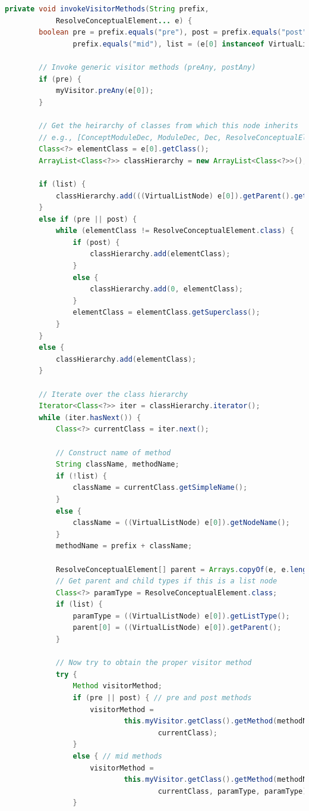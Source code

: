 \documentclass[times]{speauth}
\begin{document}
\begin{lstlisting}[language=java,caption={TreeWalker.java}]
    private void invokeVisitorMethods(String prefix,
            ResolveConceptualElement... e) {
        boolean pre = prefix.equals("pre"), post = prefix.equals("post"), mid =
                prefix.equals("mid"), list = (e[0] instanceof VirtualListNode);

        // Invoke generic visitor methods (preAny, postAny)
        if (pre) {
            myVisitor.preAny(e[0]);
        }

        // Get the heirarchy of classes from which this node inherits
        // e.g., [ConceptModuleDec, ModuleDec, Dec, ResolveConceptualElement]
        Class<?> elementClass = e[0].getClass();
        ArrayList<Class<?>> classHierarchy = new ArrayList<Class<?>>();

        if (list) {
            classHierarchy.add(((VirtualListNode) e[0]).getParent().getClass());
        }
        else if (pre || post) {
            while (elementClass != ResolveConceptualElement.class) {
                if (post) {
                    classHierarchy.add(elementClass);
                }
                else {
                    classHierarchy.add(0, elementClass);
                }
                elementClass = elementClass.getSuperclass();
            }
        }
        else {
            classHierarchy.add(elementClass);
        }

        // Iterate over the class hierarchy
        Iterator<Class<?>> iter = classHierarchy.iterator();
        while (iter.hasNext()) {
            Class<?> currentClass = iter.next();

            // Construct name of method
            String className, methodName;
            if (!list) {
                className = currentClass.getSimpleName();
            }
            else {
                className = ((VirtualListNode) e[0]).getNodeName();
            }
            methodName = prefix + className;

            ResolveConceptualElement[] parent = Arrays.copyOf(e, e.length);
            // Get parent and child types if this is a list node
            Class<?> paramType = ResolveConceptualElement.class;
            if (list) {
                paramType = ((VirtualListNode) e[0]).getListType();
                parent[0] = ((VirtualListNode) e[0]).getParent();
            }

            // Now try to obtain the proper visitor method
            try {
                Method visitorMethod;
                if (pre || post) { // pre and post methods
                    visitorMethod =
                            this.myVisitor.getClass().getMethod(methodName,
                                    currentClass);
                }
                else { // mid methods
                    visitorMethod =
                            this.myVisitor.getClass().getMethod(methodName,
                                    currentClass, paramType, paramType);
                }


\end{lstlisting}
\end{document}
